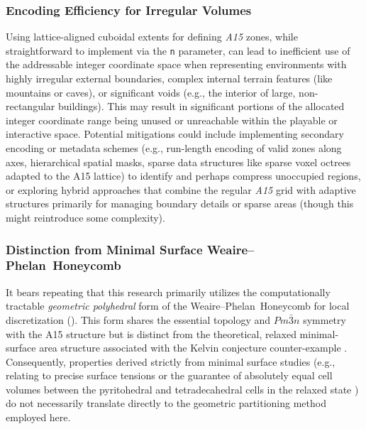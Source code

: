 \documentclass[10pt]{article}
\def\AAAB{\textit{A15}}
\def\WP{Weaire--Phelan}
\def\WPH{\WP{}~Honeycomb}
\begin{document}
\subsubsection{Encoding Efficiency for Irregular Volumes}\label{subsubsec:limits-complex}
Using lattice-aligned cuboidal extents for defining \AAAB{} zones, while straightforward to implement via the \texttt{n} parameter, can lead to inefficient use of the addressable integer coordinate space when representing environments with highly irregular external boundaries, complex internal terrain features (like mountains or caves), or significant voids (e.g., the interior of large, non-rectangular buildings). This may result in significant portions of the allocated integer coordinate range being unused or unreachable within the playable or interactive space. Potential mitigations could include implementing secondary encoding or metadata schemes (e.g., run-length encoding of valid zones along axes, hierarchical spatial masks, sparse data structures like sparse voxel octrees adapted to the A15 lattice) to identify and perhaps compress unoccupied regions, or exploring hybrid approaches that combine the regular \AAAB{} grid with adaptive structures primarily for managing boundary details or sparse areas (though this might reintroduce some complexity).

\subsubsection{Distinction from Minimal Surface \WPH{}}\label{subsubsec:limits-wp-form}
It bears repeating that this research primarily utilizes the computationally tractable \emph{geometric polyhedral} form of the \WPH{} for local discretization (). This form shares the essential topology and $Pm\bar{3}n$ symmetry with the A15 structure but is distinct from the theoretical, relaxed minimal-surface area structure associated with the Kelvin conjecture counter-example \cite{WeairePhelan1994}. Consequently, properties derived strictly from minimal surface studies (e.g., relating to precise surface tensions or the guarantee of absolutely equal cell volumes between the pyritohedral and tetradecahedral cells in the relaxed state \cite{Kusner1996}) do not necessarily translate directly to the geometric partitioning method employed here.
\end{document}
